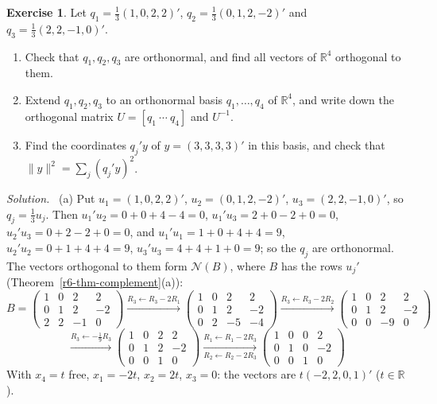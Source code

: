 \documentclass[12pt]{article}
\newcommand{\R}{\mathbb R}
\theoremstyle{definition}
\newtheorem{exercise}{Exercise}
\newenvironment{solution}{\par\noindent\textit{Solution.}\ }{\par\smallskip}
\begin{document}
\begin{exercise}\label{r6-dr-extend}
Let \(q_1=\frac13(1,0,2,2)'\), \(q_2=\frac13(0,1,2,-2)'\) and \(q_3=\frac13(2,2,-1,0)'\).
\begin{enumerate}
\item Check that \(q_1,q_2,q_3\) are orthonormal, and find all vectors of \(\R^4\) orthogonal to them.
\item Extend \(q_1,q_2,q_3\) to an orthonormal basis \(q_1,\dots,q_4\) of \(\R^4\), and write down the orthogonal
matrix \(U=[q_1\ \cdots\ q_4]\) and \(U^{-1}\).
\item Find the coordinates \(q_j'y\) of \(y=(3,3,3,3)'\) in this basis, and check that
\(\lVert y\rVert^2=\sum_j(q_j'y)^2\).
\end{enumerate}
\end{exercise}
\begin{solution}
(a) Put \(u_1=(1,0,2,2)'\), \(u_2=(0,1,2,-2)'\), \(u_3=(2,2,-1,0)'\), so \(q_j=\frac13u_j\). Then
\(u_1'u_2=0+0+4-4=0\), \(u_1'u_3=2+0-2+0=0\), \(u_2'u_3=0+2-2+0=0\), and \(u_1'u_1=1+0+4+4=9\),
\(u_2'u_2=0+1+4+4=9\), \(u_3'u_3=4+4+1+0=9\); so the \(q_j\) are orthonormal. The vectors orthogonal to them form
\(\mathcal N(B)\), where \(B\) has the rows \(u_j'\) (Theorem~\ref{r6-thm-complement}(a)):
\[
B=\begin{pmatrix}1&0&2&2\\0&1&2&-2\\2&2&-1&0\end{pmatrix}
\xrightarrow{R_3\leftarrow R_3-2R_1}
\begin{pmatrix}1&0&2&2\\0&1&2&-2\\0&2&-5&-4\end{pmatrix}
\xrightarrow{R_3\leftarrow R_3-2R_2}
\begin{pmatrix}1&0&2&2\\0&1&2&-2\\0&0&-9&0\end{pmatrix}
\]
\[
\xrightarrow{R_3\leftarrow-\frac19R_3}
\begin{pmatrix}1&0&2&2\\0&1&2&-2\\0&0&1&0\end{pmatrix}
\xrightarrow[R_2\leftarrow R_2-2R_3]{R_1\leftarrow R_1-2R_3}
\begin{pmatrix}1&0&0&2\\0&1&0&-2\\0&0&1&0\end{pmatrix}
\]
With \(x_4=t\) free, \(x_1=-2t\), \(x_2=2t\), \(x_3=0\): the vectors are \(t(-2,2,0,1)'\) (\(t\in\R\)).


\end{solution}
\end{document}
